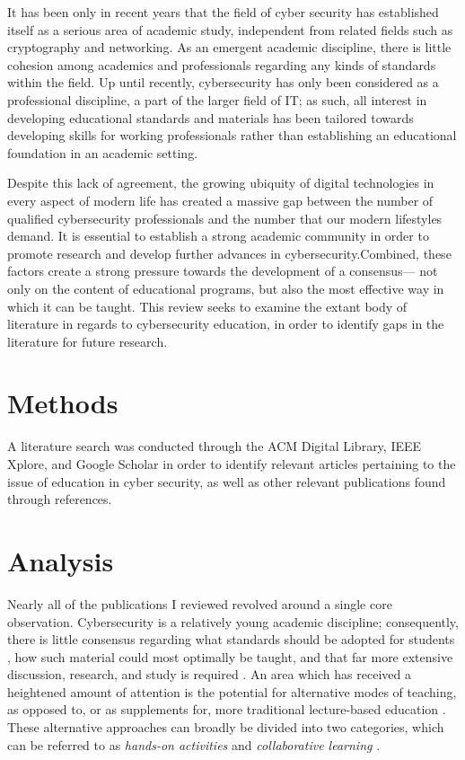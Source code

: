
    It has been only in recent years that the field of cyber security has established itself as a serious area of academic study, independent from related fields such as cryptography and networking. %
As an emergent academic discipline, there is little cohesion among academics and professionals regarding any kinds of standards within the field. %
Up until recently, cybersecurity has only been considered as a professional discipline, a part of the larger field of IT; %
as such, all interest in developing educational standards and materials has been tailored towards developing skills for working professionals rather than establishing an educational foundation in an academic setting. 

    Despite this lack of agreement, the growing ubiquity of digital technologies in every aspect of modern life has created a massive gap between the number of qualified cybersecurity professionals and the number that our modern lifestyles demand. %
It is essential to establish a strong academic community in order to promote research and develop further advances in cybersecurity.Combined, these factors create a strong pressure towards the development of a consensus---%
not only on the content of educational programs, but also the most effective way in which it can be taught. %
This review seeks to examine the extant body of literature in regards to cybersecurity education, in order to identify gaps in the literature for future research.

\section{Methods}

    A literature search was conducted through the ACM Digital Library, IEEE Xplore, and Google Scholar in order to identify relevant articles pertaining to the issue of education in cyber security, as well as other relevant publications found through references.

\section{Analysis}

    Nearly all of the publications I reviewed revolved around a single core observation. %
Cybersecurity is a relatively young academic discipline; %
consequently, there is little consensus regarding what standards should be adopted for students \cite{R-Raj}, how such material could most optimally be taught, and that far more extensive discussion, research, and study is required \cite{Z-Zeng}. %
An area which has received a heightened amount of attention is the potential for alternative modes of teaching, as opposed to, or as supplements for, more traditional lecture-based education \cite{Z-Zeng,N-Eliot,E-Gavas,C-Herr,K-Chung, C-Kussmaul,K-Leune,B-Payne,L-Thomas}. %
These alternative approaches can broadly be divided into two categories, which can be referred to as \emph{hands-on activities} and \emph{collaborative learning} \cite{P-Deshpande,C-Kussmaul,B-Payne}.

